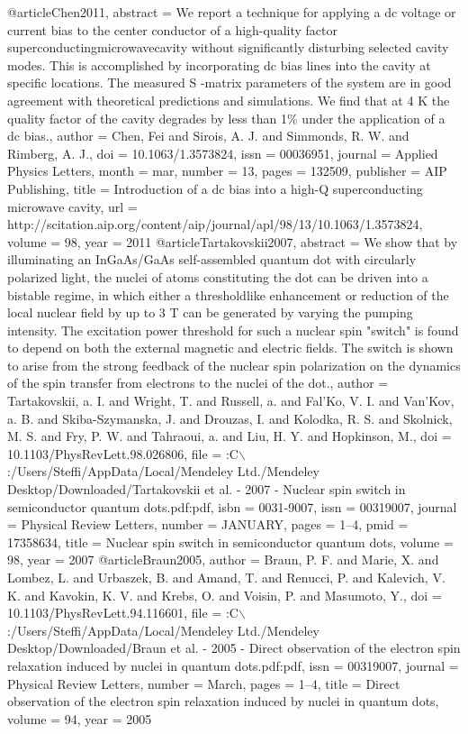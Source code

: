 @article{Chen2011,
abstract = {We report a technique for applying a dc voltage or current bias to the center conductor of a high-quality factor superconductingmicrowavecavity without significantly disturbing selected cavity modes. This is accomplished by incorporating dc bias lines into the cavity at specific locations. The measured S -matrix parameters of the system are in good agreement with theoretical predictions and simulations. We find that at 4 K the quality factor of the cavity degrades by less than 1{\%} under the application of a dc bias.},
author = {Chen, Fei and Sirois, A. J. and Simmonds, R. W. and Rimberg, A. J.},
doi = {10.1063/1.3573824},
issn = {00036951},
journal = {Applied Physics Letters},
month = {mar},
number = {13},
pages = {132509},
publisher = {AIP Publishing},
title = {{Introduction of a dc bias into a high-Q superconducting microwave cavity}},
url = {http://scitation.aip.org/content/aip/journal/apl/98/13/10.1063/1.3573824},
volume = {98},
year = {2011}
}
@article{Tartakovskii2007,
abstract = {We show that by illuminating an InGaAs/GaAs self-assembled quantum dot with circularly polarized light, the nuclei of atoms constituting the dot can be driven into a bistable regime, in which either a thresholdlike enhancement or reduction of the local nuclear field by up to 3 T can be generated by varying the pumping intensity. The excitation power threshold for such a nuclear spin "switch" is found to depend on both the external magnetic and electric fields. The switch is shown to arise from the strong feedback of the nuclear spin polarization on the dynamics of the spin transfer from electrons to the nuclei of the dot.},
author = {Tartakovskii, a. I. and Wright, T. and Russell, a. and Fal'Ko, V. I. and Van'Kov, a. B. and Skiba-Szymanska, J. and Drouzas, I. and Kolodka, R. S. and Skolnick, M. S. and Fry, P. W. and Tahraoui, a. and Liu, H. Y. and Hopkinson, M.},
doi = {10.1103/PhysRevLett.98.026806},
file = {:C$\backslash$:/Users/Steffi/AppData/Local/Mendeley Ltd./Mendeley Desktop/Downloaded/Tartakovskii et al. - 2007 - Nuclear spin switch in semiconductor quantum dots.pdf:pdf},
isbn = {0031-9007},
issn = {00319007},
journal = {Physical Review Letters},
number = {JANUARY},
pages = {1--4},
pmid = {17358634},
title = {{Nuclear spin switch in semiconductor quantum dots}},
volume = {98},
year = {2007}
}
@article{Braun2005,
author = {Braun, P. F. and Marie, X. and Lombez, L. and Urbaszek, B. and Amand, T. and Renucci, P. and Kalevich, V. K. and Kavokin, K. V. and Krebs, O. and Voisin, P. and Masumoto, Y.},
doi = {10.1103/PhysRevLett.94.116601},
file = {:C$\backslash$:/Users/Steffi/AppData/Local/Mendeley Ltd./Mendeley Desktop/Downloaded/Braun et al. - 2005 - Direct observation of the electron spin relaxation induced by nuclei in quantum dots.pdf:pdf},
issn = {00319007},
journal = {Physical Review Letters},
number = {March},
pages = {1--4},
title = {{Direct observation of the electron spin relaxation induced by nuclei in quantum dots}},
volume = {94},
year = {2005}
}
